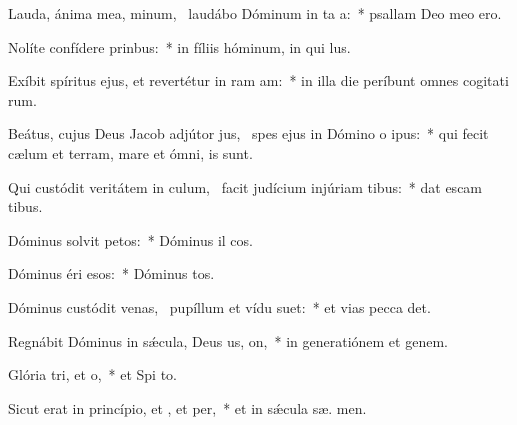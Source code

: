 \item Lauda, ánima mea, minum,~\pscross{} laudábo Dóminum in ta a:~* psallam Deo meo  ero.
\item Nolíte confídere  prinbus:~* in fíliis hóminum, in qui   lus.
\item Exíbit spíritus ejus, et revertétur in ram am:~* in illa die períbunt omnes cogitati rum.
\item Beátus, cujus Deus Jacob adjútor jus,~\pscross{} spes ejus in Dómino o ipus:~* qui fecit cælum et terram, mare et ómni,   is sunt.
\item Qui custódit veritátem in culum,~\pscross{} facit judícium injúriam tibus:~* dat escam tibus.
\item Dóminus solvit petos:~* Dóminus il cos.
\item Dóminus éri esos:~* Dóminus  tos.
\item Dóminus custódit venas,~\pscross{} pupíllum et vídu suet:~* et vias pecca det.
\item Regnábit Dóminus in sǽcula, Deus us, on,~* in generatiónem et genem.
\item Glória tri, et o,~* et Spi to.
\item Sicut erat in princípio, et , et per,~* et in sǽcula sæ. men.
